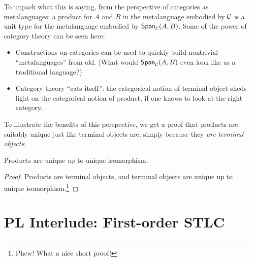 To unpack what this is saying, from the perspective of categories as metalanguages:
a product for \(A\) and \(B\) in the metalanguage embodied
by \(\mathcal C\) is a unit type for the metalanguage
embodied by \(\mathsf{Span}_\mathcal C(A,B)\).
Some of the power of category theory can be seen here:
\begin{itemize}
\item Constructions on categories can be used to quickly build
  nontrivial ``metalanguages'' from old.
  (What would \(\mathsf{Span}_\mathcal C(A,B)\) even look like as a traditional language?)
\item Category theory ``eats itself'': the categorical notion of terminal object
  sheds light on the categorical notion of product, if one knows to look at
  the right category.
\end{itemize}
To illustrate the benefits of this perspective,
we get a proof that products are suitably unique
just like terminal objects are, simply because they \emph{are terminal objects}:
\begin{proposition}
  Products are unique up to unique isomorphism.
\end{proposition}
\begin{proof}
  Products are terminal objects,
  and terminal objects are unique up to unique isomorphism.\footnote{Phew! What a nice short proof!}
\end{proof}




\chapter{PL Interlude: First-order STLC}

